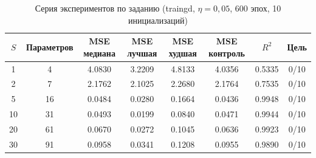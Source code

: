 \begin{table}[H]
\caption{Серия экспериментов по заданию (traingd, $\eta=0{,}05$, 600 эпох, 10 инициализаций)}
\label{tab:series}
\centering
\small
\begin{tabular}{cccccccc}
\toprule
$S$ & Параметров & MSE медиана & MSE лучшая & MSE худшая & MSE контроль & $R^2$ & Цель \\
\midrule
1 & 4 & 4.0830 & 3.2209 & 4.8133 & 4.0356 & 0.5335 & 0/10 \\
2 & 7 & 2.1762 & 2.1025 & 2.2680 & 2.1764 & 0.7535 & 0/10 \\
5 & 16 & 0.0484 & 0.0280 & 0.1664 & 0.0436 & 0.9948 & 0/10 \\
10 & 31 & 0.0493 & 0.0199 & 0.0840 & 0.0471 & 0.9944 & 0/10 \\
20 & 61 & 0.0670 & 0.0272 & 0.1045 & 0.0636 & 0.9923 & 0/10 \\
30 & 91 & 0.0958 & 0.0341 & 0.1208 & 0.0955 & 0.9890 & 0/10 \\
\bottomrule
\end{tabular}
\end{table}
